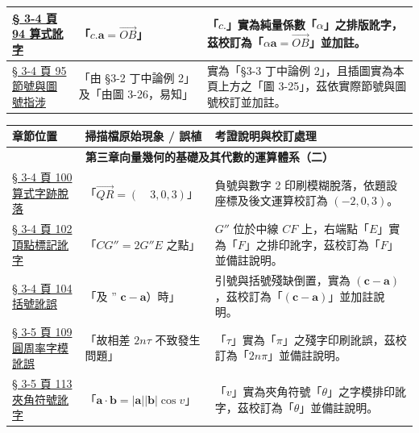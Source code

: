 \documentclass[a4paper,12pt,twoside]{article}
\begin{document}
\begin{table}[H]
\begin{tabularx}{\textwidth}{|p{3.0cm}|p{3.8cm}|X|}
\hyperref[note:b3-ch3-p94-alpha-c-typo]{§ 3-4 頁 94 算式訛字} & 
「$c.\mathbf{a} = \vec{OB}$」 & 
「$c.$」實為純量係數「$\alpha$」之排版訛字，茲校訂為「$\alpha\mathbf{a} = \vec{OB}$」並加註。 \\ \hline

\hyperref[note:b3-ch3-p95-ex2-ref]{§ 3-4 頁 95 節號與圖號指涉} & 
「由 §3-2 丁中論例 2」及「由圖 3-26，易知」 & 
實為「§3-3 丁中論例 2」，且插圖實為本頁上方之「圖 3-25」，茲依實際節號與圖號校訂並加註。 \\ \hline

\end{tabularx}
\end{table}

\begin{table}[H]
\centering
\small
\renewcommand{\arraystretch}{1.35}
\begin{tabularx}{\textwidth}{|p{3.0cm}|p{3.8cm}|X|}
\hline
\textbf{章節位置} & \textbf{掃描檔原始現象 / 誤植} & \textbf{考證說明與校訂處理} \\ \hline

\multicolumn{3}{|c|}{\textbf{第三章\quad 向量幾何的基礎及其代數的運算體系（二）}} \\ \hline

\hyperref[note:b3-ch3-p100-qr-typo]{§ 3-4 頁 100 算式字跡脫落} & 
「$\vec{QR} = (\quad 3, 0, 3)$」 & 
負號與數字 2 印刷模糊脫落，依題設座標及後文運算校訂為 $(-2, 0, 3)$。 \\ \hline

\hyperref[note:b3-ch3-p102-ge-typo]{§ 3-4 頁 102 頂點標記訛字} & 
「$CG'' = 2G''E$ 之點」 & 
$G''$ 位於中線 $CF$ 上，右端點「$E$」實為「$F$」之排印訛字，茲校訂為「$F$」並備註說明。 \\ \hline

\hyperref[note:b3-ch3-p104-prob7-typo]{§ 3-4 頁 104 括號訛誤} & 
「及 $\text{'' }\mathbf{c}-\mathbf{a}$）時」 & 
引號與括號殘缺倒置，實為 $(\mathbf{c}-\mathbf{a})$，茲校訂為「$(\mathbf{c}-\mathbf{a})$」並加註說明。 \\ \hline

\hyperref[note:b3-ch3-p109-tau-typo]{§ 3-5 頁 109 圓周率字模訛誤} & 
「故相差 $2n\tau$ 不致發生問題」 & 
「$\tau$」實為「$\pi$」之殘字印刷訛誤，茲校訂為「$2n\pi$」並備註說明。 \\ \hline

\hyperref[note:b3-ch3-p113-cos-theta-typo]{§ 3-5 頁 113 夾角符號訛字} & 
「$\mathbf{a}\cdot\mathbf{b} = |\mathbf{a}||\mathbf{b}|\cos v$」 & 
「$v$」實為夾角符號「$\theta$」之字模排印訛字，茲校訂為「$\theta$」並備註說明。 \\ \hline


\end{tabularx}
\end{table}
\end{document}
